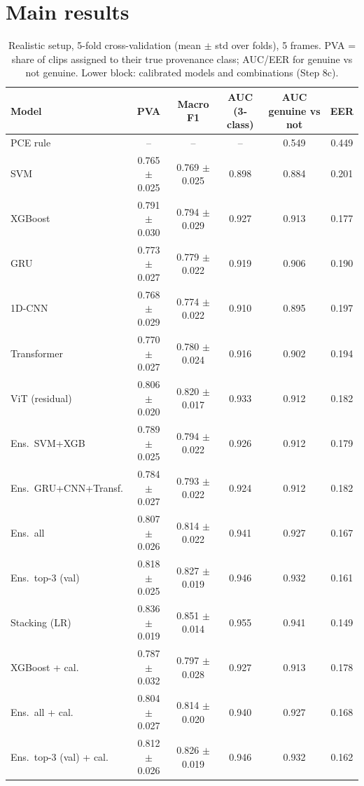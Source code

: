 \documentclass[11pt,a4paper]{article}
\begin{document}
\section{Main results}
\begin{table}[H]\centering\small\setlength{\tabcolsep}{4pt}\caption{Realistic setup, 5-fold cross-validation (mean $\pm$ std over folds), 5 frames. PVA = share of clips assigned to their true provenance class; AUC/EER for genuine vs not genuine. Lower block: calibrated models and combinations (Step 8c).}\label{tab:main}\begin{tabular}{lccccc}\toprule Model & PVA & Macro F1 & AUC (3-class) & AUC genuine vs not & EER \\\midrule
PCE rule & -- & -- & -- & 0.549 & 0.449 \\
SVM & 0.765 $\pm$ 0.025 & 0.769 $\pm$ 0.025 & 0.898 & 0.884 & 0.201 \\
XGBoost & 0.791 $\pm$ 0.030 & 0.794 $\pm$ 0.029 & 0.927 & 0.913 & 0.177 \\
GRU & 0.773 $\pm$ 0.027 & 0.779 $\pm$ 0.022 & 0.919 & 0.906 & 0.190 \\
1D-CNN & 0.768 $\pm$ 0.029 & 0.774 $\pm$ 0.022 & 0.910 & 0.895 & 0.197 \\
Transformer & 0.770 $\pm$ 0.027 & 0.780 $\pm$ 0.024 & 0.916 & 0.902 & 0.194 \\
ViT (residual) & 0.806 $\pm$ 0.020 & 0.820 $\pm$ 0.017 & 0.933 & 0.912 & 0.182 \\
\midrule
Ens.\ SVM+XGB & 0.789 $\pm$ 0.025 & 0.794 $\pm$ 0.022 & 0.926 & 0.912 & 0.179 \\
Ens.\ GRU+CNN+Transf. & 0.784 $\pm$ 0.027 & 0.793 $\pm$ 0.022 & 0.924 & 0.912 & 0.182 \\
Ens.\ all & 0.807 $\pm$ 0.026 & 0.814 $\pm$ 0.022 & 0.941 & 0.927 & 0.167 \\
Ens.\ top-3 (val) & 0.818 $\pm$ 0.025 & 0.827 $\pm$ 0.019 & 0.946 & 0.932 & 0.161 \\
Stacking (LR) & 0.836 $\pm$ 0.019 & 0.851 $\pm$ 0.014 & 0.955 & 0.941 & 0.149 \\
XGBoost + cal. & 0.787 $\pm$ 0.032 & 0.797 $\pm$ 0.028 & 0.927 & 0.913 & 0.178 \\
Ens.\ all + cal. & 0.804 $\pm$ 0.027 & 0.814 $\pm$ 0.020 & 0.940 & 0.927 & 0.168 \\
Ens.\ top-3 (val) + cal. & 0.812 $\pm$ 0.026 & 0.826 $\pm$ 0.019 & 0.946 & 0.932 & 0.162 \\
\bottomrule\end{tabular}\end{table}
\end{document}

